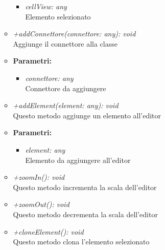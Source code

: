 \begin{itemize}
\begin{itemize}
\begin{itemize}
            					\item \emph{cellView: any}\\
            					Elemento selezionato
            				\end{itemize}
            			\item \emph{+addConnettore(connettore: any): void}\\
            			Aggiunge il connettore alla classe
            			\item \textbf{Parametri:}\\
            				\begin{itemize}
            					\item \emph{connettore: any}\\
            					Connettore da aggiungere
            				\end{itemize} 
            			\item \emph{+addElement(element: any): void}\\
            			Questo metodo aggiunge un elemento all'editor
            			\item \textbf{Parametri:}\\
            				\begin{itemize}
            					\item \emph{element: any}\\
            					Elemento da aggiungere all'editor
            				\end{itemize}   
            			\item \emph{+zoomIn(): void}\\
            			Questo metodo incrementa la scala dell'editor
            			\item \emph{+zoomOut(): void}\\
            			Questo metodo decrementa la scala dell'editor   	
            			\item \emph{+cloneElement(): void}\\
            			Questo metodo clona l'elemento selezionato			
          			\end{itemize}
          		\end{itemize}
